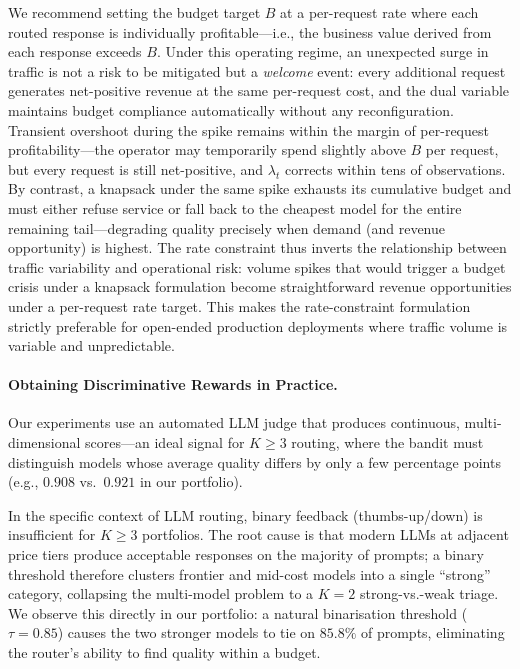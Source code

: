 We recommend setting the budget target $B$ at a per-request rate where each routed response is individually profitable---i.e., the business value derived from each response exceeds $B$.
Under this operating regime, an unexpected surge in traffic is not a risk to be mitigated but a \emph{welcome} event: every additional request generates net-positive revenue at the same per-request cost, and the dual variable maintains budget compliance automatically without any reconfiguration.
Transient overshoot during the spike remains within the margin of per-request profitability---the operator may temporarily spend slightly above $B$ per request, but every request is still net-positive, and $\lambda_t$ corrects within tens of observations.
By contrast, a knapsack under the same spike exhausts its cumulative budget and must either refuse service or fall back to the cheapest model for the entire remaining tail---degrading quality precisely when demand (and revenue opportunity) is highest.
The rate constraint thus inverts the relationship between traffic variability and operational risk: volume spikes that would trigger a budget crisis under a knapsack formulation become straightforward revenue opportunities under a per-request rate target.
This makes the rate-constraint formulation strictly preferable for open-ended production deployments where traffic volume is variable and unpredictable.

\paragraph{Obtaining Discriminative Rewards in Practice.}
Our experiments use an automated LLM judge that produces continuous, multi-dimensional scores---an ideal signal for $K{\geq}3$ routing, where the bandit must distinguish models whose average quality differs by only a few percentage points (e.g., $0.908$ vs.\ $0.921$ in our portfolio).

In the specific context of LLM routing, binary feedback (thumbs-up/down) is insufficient for $K{\geq}3$ portfolios.
The root cause is that modern LLMs at adjacent price tiers produce acceptable responses on the majority of prompts; a binary threshold therefore clusters frontier and mid-cost models into a single ``strong'' category, collapsing the multi-model problem to a $K{=}2$ strong-vs.-weak triage.
We observe this directly in our portfolio: a natural binarisation threshold ($\tau{=}0.85$) causes the two stronger models to tie on $85.8\%$ of prompts, eliminating the router's ability to find quality within a budget.

